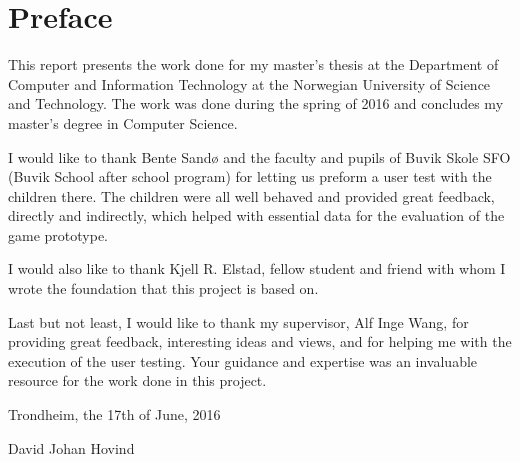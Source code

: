 \chapter*{Preface}
This report presents the work done for my master's thesis at the Department of Computer and Information Technology at the Norwegian University of Science and Technology. The work was done during the spring of 2016 and concludes my master's degree in Computer Science.

I would like to thank Bente Sandø and the faculty and pupils of Buvik Skole SFO (Buvik School after school program) for letting us preform a user test with the children there. The children were all well behaved and provided great feedback, directly and indirectly, which helped with essential data for the evaluation of the game prototype.

I would also like to thank Kjell R. Elstad, fellow student and friend with whom I wrote the foundation that this project is based on.

Last but not least, I would like to thank my supervisor, Alf Inge Wang, for providing great feedback, interesting ideas and views, and for helping me with the execution of the user testing. Your guidance and expertise was an invaluable resource for the work done in this project.

\vspace{2cm}
\begin{center}
Trondheim, the 17th of June, 2016

\vspace{2em}
David Johan Hovind
\end{center}